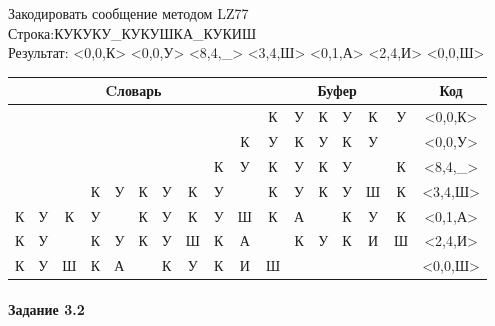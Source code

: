 \documentclass[a4paper, 12pt]{article}
\begin{document}
Закодировать сообщение методом LZ77\\
Строка:КУКУКУ\_КУКУШКА\_КУКИШ\\
Результат: <0,0,К> <0,0,У> <8,4,\_> <3,4,Ш> <0,1,А> <2,4,И> <0,0,Ш>\\
\begin{table}[h!]
\centering
\begin{tabular}{|c|c|c|c|c|c|c|c|c|c|c|c|c|c|c|c|c|} 
\hline
\multicolumn{10}{|c|}{Cловарь} & \multicolumn{6}{c|}{Буфер} & Код  \\ \hline
  &   &   &   &   &   &   &   &   &   & \cellcolor[HTML]{8CE4F6} К & У & К & У & К & У & <0,0,К>
\\ \hline
  &   &   &   &   &   &   &   &   & К & \cellcolor[HTML]{8CE4F6} У & К & У & К & У &   & <0,0,У>
\\ \hline
  &   &   &   &   &   &   &   & \cellcolor[HTML]{FFFF00} К & \cellcolor[HTML]{FFFF00} У & \cellcolor[HTML]{FFFF00} К & \cellcolor[HTML]{FFFF00} У & \cellcolor[HTML]{FFFF00} К & \cellcolor[HTML]{FFFF00} У & \cellcolor[HTML]{8CE4F6}   & К & <8,4,\_>
\\ \hline
  &   &   & \cellcolor[HTML]{FFFF00} К & \cellcolor[HTML]{FFFF00} У & \cellcolor[HTML]{FFFF00} К & \cellcolor[HTML]{FFFF00} У & К & У &   & \cellcolor[HTML]{FFFF00} К & \cellcolor[HTML]{FFFF00} У & \cellcolor[HTML]{FFFF00} К & \cellcolor[HTML]{FFFF00} У & \cellcolor[HTML]{8CE4F6} Ш & К & <3,4,Ш>
\\ \hline
\cellcolor[HTML]{FFFF00} К & У & К & У &   & К & У & К & У & Ш & \cellcolor[HTML]{FFFF00} К & \cellcolor[HTML]{8CE4F6} А &   & К & У & К & <0,1,А>
\\ \hline
К & У & \cellcolor[HTML]{FFFF00}   & \cellcolor[HTML]{FFFF00} К & \cellcolor[HTML]{FFFF00} У & \cellcolor[HTML]{FFFF00} К & У & Ш & К & А & \cellcolor[HTML]{FFFF00}   & \cellcolor[HTML]{FFFF00} К & \cellcolor[HTML]{FFFF00} У & \cellcolor[HTML]{FFFF00} К & \cellcolor[HTML]{8CE4F6} И & Ш & <2,4,И>
\\ \hline
К & У & Ш & К & А &   & К & У & К & И & \cellcolor[HTML]{8CE4F6} Ш &   &   &   &   &   & <0,0,Ш>
\\ \hline
\end{tabular}
\end{table}

\paragraph{Задание 3.2}
\end{document}
